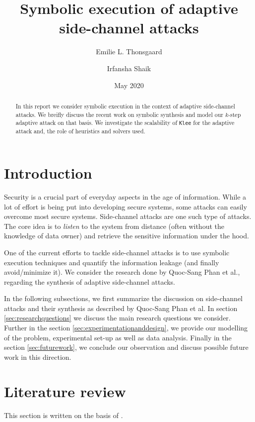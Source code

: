 \documentclass[11pt,a4paper,notitlepage]{article}
\title{Symbolic execution of adaptive side-channel attacks}
\author{Emilie L. Thonsgaard \and Irfansha Shaik}
\date{May 2020}
\begin{document}
\begin{titlingpage}
    \maketitle
    \begin{abstract}
        In this report we consider symbolic execution in the context of adaptive side-channel attacks. We breifly discuss the recent work on symbolic synthesis and model our $k$-step adaptive attack on that basis. We investigate the scalability of \texttt{Klee} for the adaptive attack and, the role of heuristics and solvers used.
    \end{abstract}
\end{titlingpage}

\tableofcontents
\newpage

\section{Introduction}
\label{cha:introduction}

Security is a crucial part of everyday aspects in the age of information.
While a lot of effort is being put into developing secure systems, some attacks can easily overcome most secure systems.
Side-channel attacks are one such type of attacks. The core idea is to \emph{listen} to the system from distance (often without the knowledge of data owner) and retrieve the sensitive information under the hood.

One of the current efforts to tackle side-channel attacks is to use symbolic execution techniques and quantify the information leakage (and finally avoid/minimize it).
We consider the research done by Quoc-Sang Phan et al., \cite{phan2017synthesis} regarding the synthesis of adaptive side-channel attacks.

In the following subsections, we first summarize the discussion on side-channel attacks and their synthesis as described by Quoc-Sang Phan et al. In section \ref{sec:researchquestions} we discuss the main research questions we consider.
Further in the section \ref{sec:experimentationanddesign}, we provide our modelling of the problem, experimental set-up as well as data analysis.
Finally in the section \ref{sec:futurework}, we conclude our observation and discuss possible future work in this direction.

\section{Literature review}
\label{cha:literaturereview}
This section is written on the basis of \cite{phan2017synthesis}.
\end{document}
